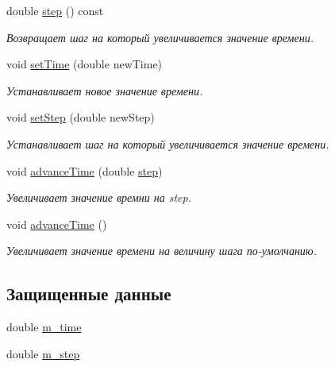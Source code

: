 \begin{DoxyCompactItemize}
double \hyperlink{class_core_1_1_function_time_a7c3dfc0d8d69c83c162c42435fa13cb9}{step} () const
\begin{DoxyCompactList}\small\item\em Возвращает шаг на который увеличивается значение времени. \end{DoxyCompactList}\item 
\hypertarget{class_core_1_1_function_time_a0db96b8aff83af1339e08425fe4fd80b}{}\label{class_core_1_1_function_time_a0db96b8aff83af1339e08425fe4fd80b} 
void \hyperlink{class_core_1_1_function_time_a0db96b8aff83af1339e08425fe4fd80b}{set\+Time} (double new\+Time)
\begin{DoxyCompactList}\small\item\em Устанавливает новое значение времени. \end{DoxyCompactList}\item 
\hypertarget{class_core_1_1_function_time_ad1a60dab2d7d8a046893751843c13208}{}\label{class_core_1_1_function_time_ad1a60dab2d7d8a046893751843c13208} 
void \hyperlink{class_core_1_1_function_time_ad1a60dab2d7d8a046893751843c13208}{set\+Step} (double new\+Step)
\begin{DoxyCompactList}\small\item\em Устанавливает шаг на который увеличивается значение времени. \end{DoxyCompactList}\item 
void \hyperlink{class_core_1_1_function_time_a1f1674cdfd0a24f69934467369e30267}{advance\+Time} (double \hyperlink{class_core_1_1_function_time_a7c3dfc0d8d69c83c162c42435fa13cb9}{step})
\begin{DoxyCompactList}\small\item\em Увеличивает значение времни на step. \end{DoxyCompactList}\item 
void \hyperlink{class_core_1_1_function_time_ab2b13d7c42f8a52c2f4ae58efb88ef73}{advance\+Time} ()
\begin{DoxyCompactList}\small\item\em Увеличивает значение времени на величину шага по-\/умолчанию. \end{DoxyCompactList}\end{DoxyCompactItemize}
\subsection*{Защищенные данные}
\begin{DoxyCompactItemize}
\item 
double \hyperlink{class_core_1_1_function_time_a12192d0047976f9cd6376e986e43451c}{m\+\_\+time}
\item 
double \hyperlink{class_core_1_1_function_time_a31d15f7adb8bdecfd22bd35c8fd6eefe}{m\+\_\+step}
\end{DoxyCompactItemize}


